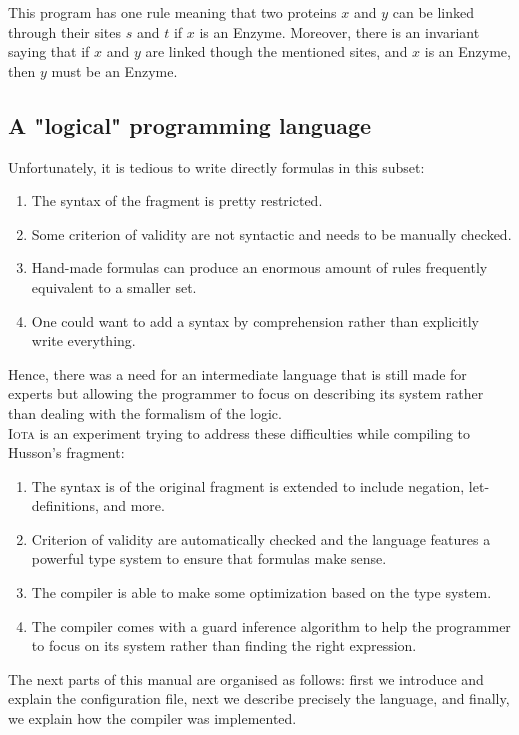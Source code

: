 \documentclass[10pt,a4paper]{article}
\newcommand\Iota{\textsc{Iota}}
\begin{document}
This program has one rule meaning that two proteins $x$ and $y$ can be linked through their sites $s$ and $t$ if $x$ is an Enzyme. Moreover, there is an invariant saying that if $x$ and $y$ are linked though the mentioned sites, and $x$ is an Enzyme, then $y$ must be an Enzyme.

\subsection{A "logical" programming language}
Unfortunately, it is tedious to write directly formulas in this subset:

\begin{enumerate}
\item The syntax of the fragment is pretty restricted.
\item Some criterion of validity are not syntactic and needs to be manually checked.
\item Hand-made formulas can produce an enormous amount of rules frequently equivalent to a smaller set.
\item One could want to add a syntax by comprehension rather than explicitly write everything.
\end{enumerate}

Hence, there was a need for an intermediate language that is still made for experts but allowing the programmer to focus on describing its system rather than dealing with the formalism of the logic.\\
\Iota{} is an experiment trying to address these difficulties while compiling to Husson's fragment:
\begin{enumerate}
\item The syntax is of the original fragment is extended to include negation, let-definitions, and more.
\item Criterion of validity are automatically checked and the language features a powerful type system to ensure that formulas make sense.
\item The compiler is able to make some optimization based on the type system.
\item The compiler comes with a guard inference algorithm to help the programmer to focus on its system rather than finding the right expression.
\end{enumerate}

The next parts of this manual are organised as follows: first we introduce and explain the configuration file, next we describe precisely the language, and finally, we explain how the compiler was implemented.
\end{document}
